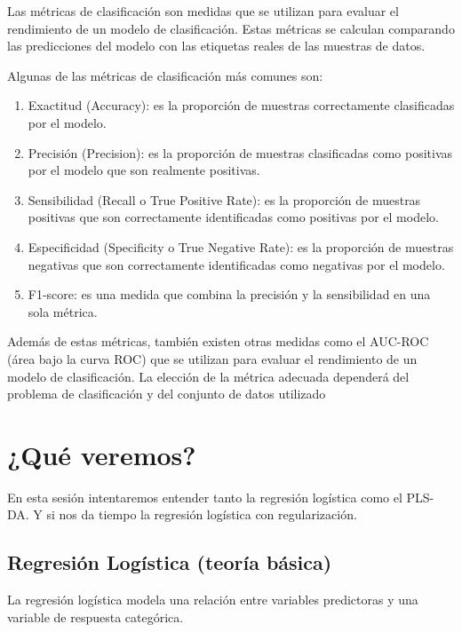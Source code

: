 \documentclass[
  letterpaper,
  DIV=11,
  numbers=noendperiod]{scrartcl}
\begin{document}
Las métricas de clasificación son medidas que se utilizan para evaluar
el rendimiento de un modelo de clasificación. Estas métricas se calculan
comparando las predicciones del modelo con las etiquetas reales de las
muestras de datos.

Algunas de las métricas de clasificación más comunes son:

\begin{enumerate}
\def\labelenumi{\arabic{enumi}.}
\item
  Exactitud (Accuracy): es la proporción de muestras correctamente
  clasificadas por el modelo.
\item
  Precisión (Precision): es la proporción de muestras clasificadas como
  positivas por el modelo que son realmente positivas.
\item
  Sensibilidad (Recall o True Positive Rate): es la proporción de
  muestras positivas que son correctamente identificadas como positivas
  por el modelo.
\item
  Especificidad (Specificity o True Negative Rate): es la proporción de
  muestras negativas que son correctamente identificadas como negativas
  por el modelo.
\item
  F1-score: es una medida que combina la precisión y la sensibilidad en
  una sola métrica.
\end{enumerate}

Además de estas métricas, también existen otras medidas como el AUC-ROC
(área bajo la curva ROC) que se utilizan para evaluar el rendimiento de
un modelo de clasificación. La elección de la métrica adecuada dependerá
del problema de clasificación y del conjunto de datos utilizado

\hypertarget{quuxe9-veremos}{%
\section{¿Qué veremos?}\label{quuxe9-veremos}}

En esta sesión intentaremos entender tanto la regresión logística como
el PLS-DA. Y si nos da tiempo la regresión logística con regularización.

\hypertarget{regresiuxf3n-loguxedstica-teoruxeda-buxe1sica}{%
\subsection{Regresión Logística (teoría
básica)}\label{regresiuxf3n-loguxedstica-teoruxeda-buxe1sica}}

La regresión logística modela una relación entre variables predictoras y
una variable de respuesta categórica.
\end{document}
